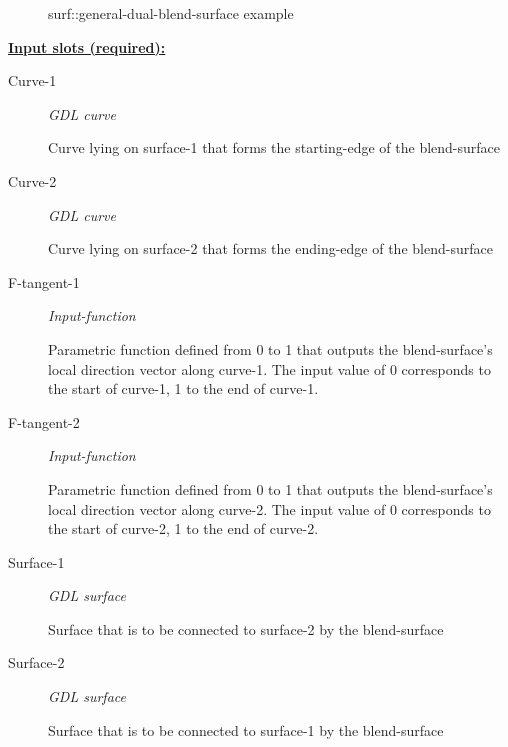 \documentclass [11pt]{book}
\begin{document}
\begin{itemize}
\begin{figure}
\caption{surf::general-dual-blend-surface example}

\label{fig:surf::general-dual-blend-surface}

\end{figure}





\textbf{
\underline{Input slots (required):}}

\begin{description}

\item [Curve-1]
\emph{GDL curve}

 Curve lying on surface-1 that forms the starting-edge of the blend-surface




\item [Curve-2]
\emph{GDL curve}

 Curve lying on surface-2 that forms the ending-edge of the blend-surface




\item [F-tangent-1]
\emph{Input-function}

 Parametric function defined from 0 to 1 that outputs the blend-surface's local direction vector along curve-1. The input value of 0 corresponds to the start of curve-1, 1 to the end of curve-1.




\item [F-tangent-2]
\emph{Input-function}

 Parametric function defined from 0 to 1 that outputs the blend-surface's local direction vector along curve-2. The input value of 0 corresponds to the start of curve-2, 1 to the end of curve-2.




\item [Surface-1]
\emph{GDL surface}

 Surface that is to be connected to surface-2 by the blend-surface




\item [Surface-2]
\emph{GDL surface}

 Surface that is to be connected to surface-1 by the blend-surface





\end{description}
\end{itemize}
\end{document}
